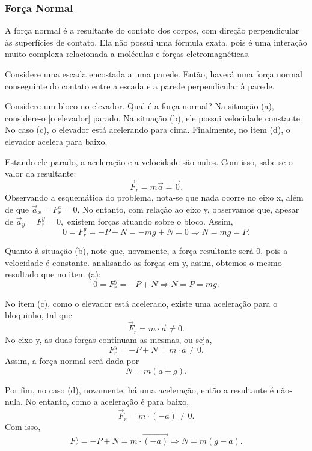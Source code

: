 \documentclass[physics_notes.tex]{subfiles}
\begin{document}
\subsubsection{Força Normal}
A força normal é a resultante do contato dos corpos, com direção perpendicular às superfícies de contato. Ela não
possui uma fórmula exata, pois é uma interação muito complexa relacionada a moléculas e forças eletromagnéticas.
\begin{example}
	Considere uma escada encostada a uma parede. Então, haverá uma força normal conseguinte do contato entre a escada
	e a parede perpendicular à parede.
	\begin{center}
	\end{center}
\end{example}
\begin{example}
	Considere um bloco no elevador. Qual é a força normal? Na situação (a), considere-o [o elevador] parado. Na
	situação (b), ele possui velocidade constante. No caso (c), o elevador está acelerando para cima. Finalmente,
	no item (d), o elevador acelera para baixo.

	Estando ele parado, a aceleração e a velocidade são nulos. Com isso, sabe-se o valor da resultante:
	$$
		\vec{F}_{r} = m \vec{a} = \vec{0}.
	$$
	Observando a esquemática do problema, nota-se que nada ocorre no eixo x, além de que $\vec{a}_{x} = F_{r}^{x} = 0.$
	No entanto, com relação ao eixo y, observamos que, apesar de $\vec{a}_{y} = F_{r}^{y} = 0,$ existem forças atuando
	sobre o bloco. Assim,
	$$
		0 = F_{r}^{y} = -P + N = -mg + N = 0 \Rightarrow N = mg = P.
	$$

	Quanto à situação (b), note que, novamente, a força resultante será 0, pois a velocidade é constante.
	analisando as forças em y, assim, obtemos o mesmo resultado que no item (a):
	$$
		0 = F_{r}^{y} = -P + N \Rightarrow N = P = mg.
	$$

	No item (c), como o elevador está acelerado, existe uma aceleração para o bloquinho, tal que
	$$
		\vec{F}_{r} = m \cdot \vec{a} \neq 0.
	$$
	No eixo y, as duas forças continuam as mesmas, ou seja,
	$$
		F_{r}^{y} = -P + N = m \cdot a\neq 0.
	$$
	Assim, a força normal será dada por
	$$
		N = m(a + g).
	$$

	Por fim, no caso (d), novamente, há uma aceleração, então a resultante é não-nula. No entanto, como a aceleração é para baixo,
	$$
		\vec{F}_{r} = m \cdot \vec{(-a)}\neq 0.
	$$
	Com isso,
	$$
		F_{r}^{y} = -P + N = m \cdot \vec{(-a)} \Rightarrow N = m(g - a).
	$$
\end{example}
\end{document}
